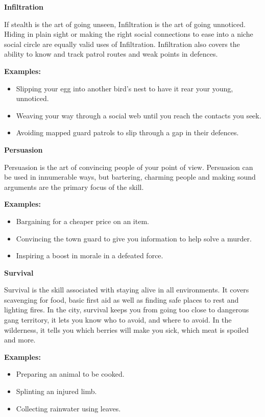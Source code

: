 \textbf{Infiltration}

If stealth is the art of going unseen, Infiltration is the art of going unnoticed. Hiding in plain sight or making the right social connections to ease into a niche social circle are equally valid uses of Infiltration. Infiltration also covers the ability to know and track patrol routes and weak points in defences.

\begin{displayquote}
    \textbf{Examples:}
    \begin{itemize}
        \item Slipping your egg into another bird's nest to have it rear your young, unnoticed.
        \item Weaving your way through a social web until you reach the contacts you seek.
        \item Avoiding mapped guard patrols to slip through a gap in their defences.
    \end{itemize}
\end{displayquote}

\textbf{Persuasion}

Persuasion is the art of convincing people of your point of view. Persuasion can be used in innumerable ways, but bartering, charming people and making sound arguments are the primary focus of the skill.

\begin{displayquote}
    \textbf{Examples:}
    \begin{itemize}
        \item Bargaining for a cheaper price on an item.
        \item Convincing the town guard to give you information to help solve a murder.
        \item Inspiring a boost in morale in a defeated force.
    \end{itemize}
\end{displayquote}

\textbf{Survival}

Survival is the skill associated with staying alive in all environments. It covers scavenging for food, basic first aid as well as finding safe places to rest and lighting fires. In the city, survival keeps you from going too close to dangerous gang territory, it lets you know who to avoid, and where to avoid. In the wilderness, it tells you which berries will make you sick, which meat is spoiled and more.

\begin{displayquote}
    \textbf{Examples:}
    \begin{itemize}
        \item Preparing an animal to be cooked.
        \item Splinting an injured limb.
        \item Collecting rainwater using leaves.
    \end{itemize}
\end{displayquote}